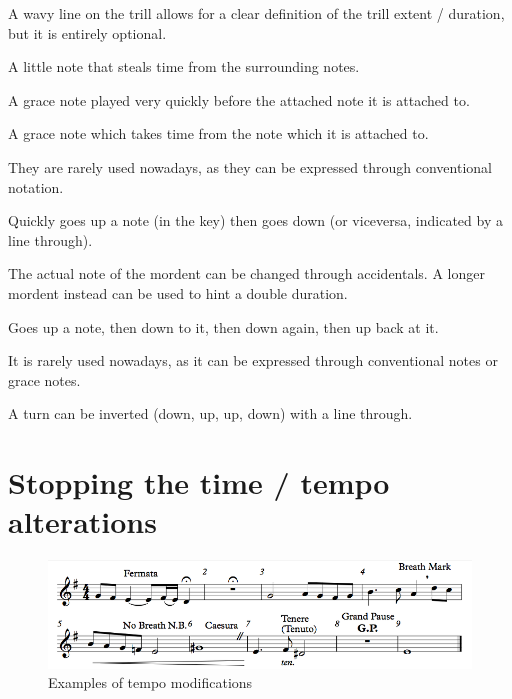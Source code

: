 A wavy line on the trill allows for a clear definition of the trill extent / duration, but it is entirely optional.

\begin{definition}
    A little note that steals time from the surrounding notes.
\end{definition}

\begin{definition}[Acciaccatura]
    A grace note played very quickly before the attached note it is attached to.
\end{definition}

\begin{definition}[Appoggiatura]
    A grace note which takes time from the note which it is attached to.

    They are rarely used nowadays, as they can be expressed through conventional notation.
\end{definition}

\begin{definition}[Mordent]
    Quickly goes up a note (in the key) then goes down (or viceversa, indicated by a line through).
\end{definition}

The actual note of the mordent can be changed through accidentals. A longer mordent instead can be used to hint a double duration.

\begin{definition}
    Goes up a note, then down to it, then down again, then up back at it.

    It is rarely used nowadays, as it can be expressed through conventional notes or grace notes.
\end{definition}

A turn can be inverted (down, up, up, down) with a line through.

\section{Stopping the time / tempo alterations}

\begin{figure}[b]
    \begin{center}
        \includegraphics[width=\textwidth]{img/stoppingtime}
        \caption{Examples of tempo modifications}
    \end{center}
\end{figure}

